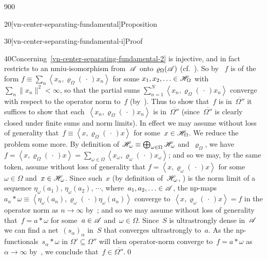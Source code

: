 \begin{parsec}{900}
\begin{point}{20}[vn-center-separating-fundamental]{Proposition}
\begin{point}{30}[vn-center-separating-fundamental-i]{Proof}
\begin{point}{40}{Concerning~\ref{vn-center-separating-fundamental-2}}
is injective,
and in fact restricts
to an nmiu-isomorphism
from~$\mathscr{A}$ onto $\varrho_\Omega(\mathscr{A})$
(cf.~).
So by~
$f$ is of the form $f\equiv 
\sum_n \left<x_n,\varrho_\Omega(\,\cdot\,)x_n\right>$
for some $x_1,x_2,\dotsc \in\mathscr{H}_\Omega$
with $\sum_n \|x_n\|^2<\infty$,
so that the partial sums
$\sum_{n=1}^N \left<x_n,\varrho_\Omega(\,\cdot\,)x_n\right>$
converge with respect to the operator norm to~$f$
(by~).
Thus to show that~$f$ is in~$\overline{\Omega''}$
it suffices to show that each~$\left<x_n,\varrho_\Omega(\,\cdot\,)x_n\right>$
is in~$\overline{\Omega''}$
(since~$\overline{\Omega''}$ is clearly closed
under finite sums and norm limits).
In effect
we may assume 
without loss of generality
that~$f\equiv \left<x,\varrho_\Omega(\,\cdot\,)x\right>$
for some~$x\in \mathscr{H}_\Omega$.
We reduce the problem some more.
By definition 
of $\mathscr{H}_\omega\equiv \bigoplus_{\omega\in\Omega}\mathscr{H}_\omega$
and~$\varrho_\Omega$,
we have $f=\left<x,\varrho_\Omega(\,\cdot\,)x\right>
= \sum_{\omega\in \Omega} 
\left<x_\omega,\varrho_\omega(\,\cdot\,)x_\omega\right>$;
and so we may, by the same token, assume without loss of generality
that $f=\left<x,\varrho_\omega(\,\cdot\,)x\right>$
for some~$\omega\in \Omega$
and~$x\in \mathscr{H}_\omega$.
Since such~$x$ (by definition of~$\mathscr{H}_\omega$, 
)
is the norm limit of
a sequence $\eta_\omega(a_1),\,\eta_\omega(a_2),\,
\dotsb$,
where~$a_1,a_2,\dotsc\in\mathscr{A}$,
the np-maps $a_n\ast \omega\equiv 
\left<\eta_\omega(a_n),\varrho_\omega(\,\cdot\,)\eta_\omega(a_n)\right>$
converge to~$\left<x,\varrho_\omega(\,\cdot\,) x\right>=f$
in the operator norm as $n\to\infty$ by~;
and so we may assume without loss of generality
that~$f=a\ast \omega$ for some~$a\in\mathscr{A}$ and~$\omega\in \Omega$.
Since~$S$ is ultrastrongly dense in~$\mathscr{A}$
we can find a net~$(s_\alpha)_\alpha$
in~$S$ that converges ultrastrongly to~$a$.
As the np-functionals~$s_\alpha \ast \omega$
in $\Omega'\subseteq \Omega''$
will then
operator-norm converge
to~$f= a\ast \omega$
as $\alpha\to\infty$
by~,
we conclude that~$f\in \overline{\Omega''}$.\qed
\end{point}
\end{point}
\end{point}
\end{parsec}
